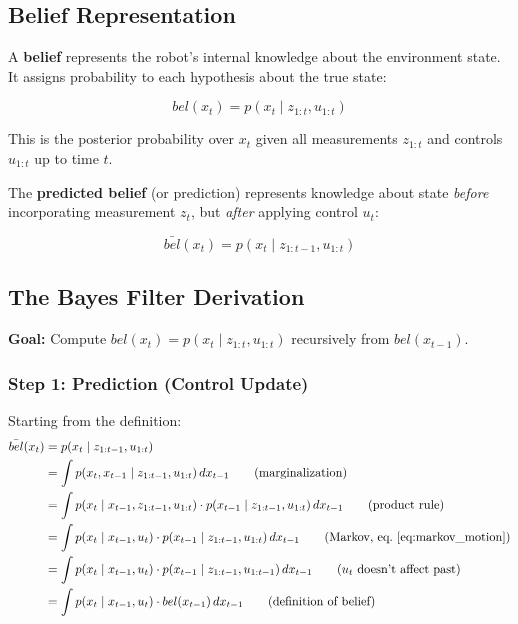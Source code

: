 \subsection{Belief Representation}

\begin{definition}[Belief]
  A \textbf{belief} represents the robot's internal knowledge about the environment state. It assigns probability to each hypothesis about the true state:

\begin{equation}
    bel(x_t) = p(x_t \mid z_{1:t}, u_{1:t})
\end{equation}

This is the posterior probability over $x_t$ given all measurements $z_{1:t}$ and controls $u_{1:t}$ up to time $t$.
\end{definition}

\begin{definition}
The \textbf{predicted belief} (or prediction) represents knowledge about state \textit{before} incorporating measurement $z_t$, but \textit{after} applying control $u_t$:

\begin{equation}
  \bar{bel}(x_t) = p(x_t \mid z_{1:t-1}, u_{1:t})
\end{equation}
\end{definition}

\subsection{The Bayes Filter Derivation}

\textbf{Goal:} Compute $bel(x_t) = p(x_t \mid z_{1:t}, u_{1:t})$ recursively from $bel(x_{t-1})$.

\subsubsection{Step 1: Prediction (Control Update)}

Starting from the definition:
\begin{align}
\bar{bel}(x_t) &= p(x_t \mid z_{1:t-1}, u_{1:t}) \\
%
&= \int p(x_t, x_{t-1} \mid z_{1:t-1}, u_{1:t}) \, dx_{t-1} 
\tag{marginalization} \\
%
&= \int p(x_t \mid x_{t-1}, z_{1:t-1}, u_{1:t}) \cdot p(x_{t-1} \mid z_{1:t-1}, u_{1:t}) \, dx_{t-1} 
\tag{product rule} \\
%
&= \int p(x_t \mid x_{t-1}, u_t) \cdot p(x_{t-1} \mid z_{1:t-1}, u_{1:t}) \, dx_{t-1} 
\tag{Markov, eq.~\ref{eq:markov_motion}} \\
%
&= \int p(x_t \mid x_{t-1}, u_t) \cdot p(x_{t-1} \mid z_{1:t-1}, u_{1:t-1}) \, dx_{t-1} 
\tag{$u_t$ doesn't affect past} \\
%
&= \int p(x_t \mid x_{t-1}, u_t) \cdot bel(x_{t-1}) \, dx_{t-1}
\tag{definition of belief}
\end{align}

